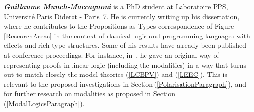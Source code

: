 \documentclass[11pt,twocolumn]{article}
\newcommand{\pref}[1]{\,(\ref{#1})}
\newcommand{\eg}{\emph{eg.}}
\newcommand{\SystemL}{\mbox{System~$L$}}
\begin{document}
\smallskip\noindent
\textbf{\em Guillaume Munch-Maccagnoni} 
%
%
is a PhD student at Laboratoire PPS, Universit\'e Paris Diderot - Paris~7.
He is currently writing up his dissertation, where he contributes to the
Propositions-as-Types correspondence of Figure\,\ref{ResearchAreas} in the
context of classical logic and programming languages with effects and rich
type structures.  Some of his results have already been published at
conference proceedings. %
For instance, 
%
%
in~\cite{Munch}, 
he gave an original way of representing proofs in linear logic (including the
modalities) in a way that turns out to match closely the model theories
(\ref{LCBPV}) and (\ref{LEEC}).  This is relevant to the proposed
investigations in Section\mbox{\pref{PolarisationParagraph}}, and for further
research on modalities as proposed in Section\pref{ModalLogicsParagraph}.
%

\end{document}

